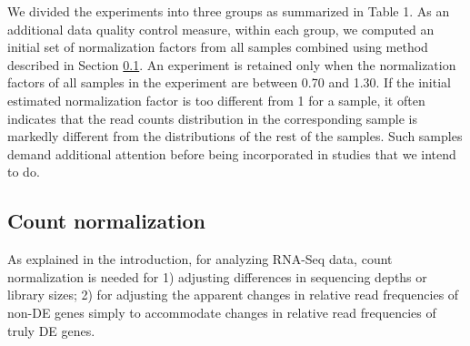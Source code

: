 \documentclass[letterpaper,12pt]{article}
\begin{document}



We divided the experiments into three groups as summarized in Table 1.  As an
additional data quality control measure, within each group, we computed an
initial set of normalization factors from all samples combined using method
described in Section \ref{section:countNormalization}.  An experiment is
retained only when the normalization factors of all samples in the experiment
are between 0.70 and 1.30.  If the initial estimated normalization factor is
too different from 1 for a sample, it often indicates that the read counts
distribution in the corresponding sample is markedly different from the
distributions of the rest of the samples. Such samples demand additional
attention before being incorporated in studies that we intend to do.



\subsection{Count normalization}\label{section:countNormalization}
As explained in the introduction, for analyzing RNA-Seq data, count
normalization is needed for 1) adjusting differences in sequencing depths or
library sizes; 2) for adjusting the apparent changes in relative read
frequencies of non-DE genes simply to accommodate changes in relative read
frequencies of truly DE genes.
\end{document}
